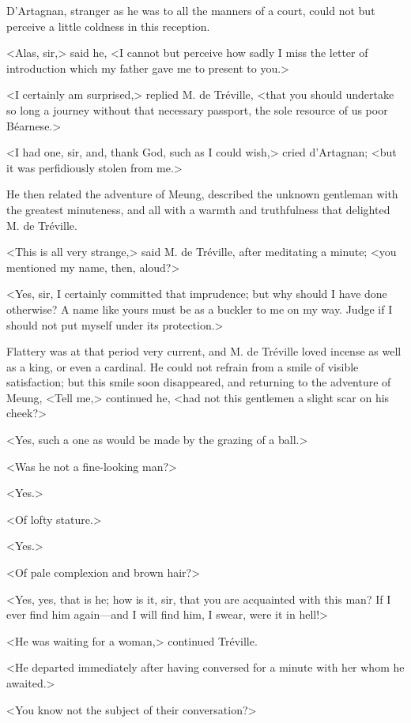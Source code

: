 D'Artagnan, stranger as he was to all the manners of a court, could not but perceive a little coldness in this reception. 

<Alas, sir,> said he, <I cannot but perceive how sadly I miss the letter of introduction which my father gave me to present to you.> 

<I certainly am surprised,> replied M. de Tréville, <that you should undertake so long a journey without that necessary passport, the sole resource of us poor Béarnese.> 

<I had one, sir, and, thank God, such as I could wish,> cried d'Artagnan; <but it was perfidiously stolen from me.> 

He then related the adventure of Meung, described the unknown gentleman with the greatest minuteness, and all with a warmth and truthfulness that delighted M. de Tréville. 

<This is all very strange,> said M. de Tréville, after meditating a minute; <you mentioned my name, then, aloud?> 

<Yes, sir, I certainly committed that imprudence; but why should I have done otherwise? A name like yours must be as a buckler to me on my way. Judge if I should not put myself under its protection.> 

Flattery was at that period very current, and M. de Tréville loved incense as well as a king, or even a cardinal. He could not refrain from a smile of visible satisfaction; but this smile soon disappeared, and returning to the adventure of Meung, <Tell me,> continued he, <had not this gentlemen a slight scar on his cheek?> 

<Yes, such a one as would be made by the grazing of a ball.> 

<Was he not a fine-looking man?> 

<Yes.> 

<Of lofty stature.> 

<Yes.> 

<Of pale complexion and brown hair?> 

<Yes, yes, that is he; how is it, sir, that you are acquainted with this man? If I ever find him again---and I will find him, I swear, were it in hell!> 

<He was waiting for a woman,> continued Tréville. 

<He departed immediately after having conversed for a minute with her whom he awaited.> 

<You know not the subject of their conversation?> 

